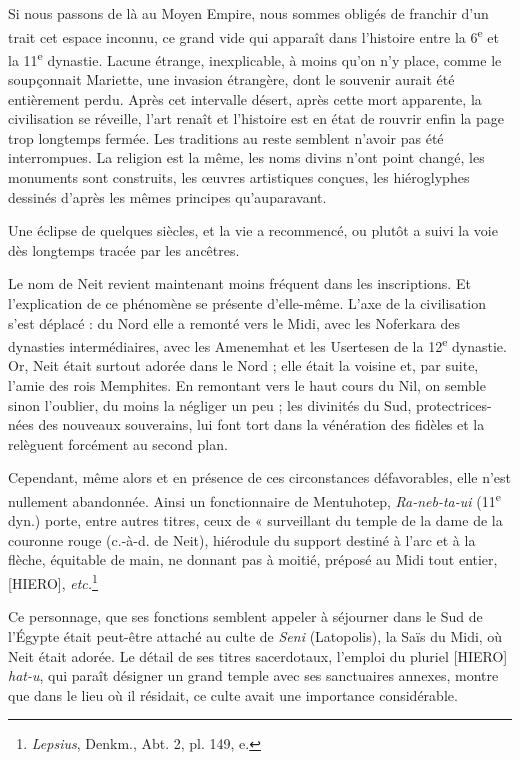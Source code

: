 \documentclass[a4paper, 11pt, oneside]{article}
\begin{document}
Si nous passons de là au Moyen Empire, nous sommes obligés de franchir d'un trait cet espace inconnu, ce grand vide qui apparaît dans l'histoire entre la 6\textsuperscript{e} et la 11\textsuperscript{e} dynastie. Lacune étrange, inexplicable, à moins qu'on n'y place, comme le soupçonnait Mariette, une invasion étrangère, dont le souvenir aurait été entièrement perdu. Après cet intervalle désert, après cette mort apparente, la civilisation se réveille, l'art renaît et l'histoire est en état de rouvrir enfin la page trop longtemps fermée. Les traditions au reste semblent n'avoir pas été interrompues. La religion est la même, les noms divins n'ont point changé, les monuments sont construits, les œuvres artistiques conçues, les hiéroglyphes dessinés d'après les mêmes principes qu'auparavant.

Une éclipse de quelques siècles, et la vie a recommencé, ou plutôt a suivi la voie dès longtemps tracée par les ancêtres.

Le nom de Neit revient maintenant moins fréquent dans les inscriptions. Et l'explication de ce phénomène se présente d'elle-même. L'axe de la civilisation s'est déplacé : du Nord elle a remonté vers le Midi, avec les Noferkara des dynasties intermédiaires, avec les Amenemhat et les Usertesen de la 12\textsuperscript{e} dynastie. Or, Neit était surtout adorée dans le Nord ; elle était la voisine et, par suite, l'amie des rois Memphites. En remontant vers le haut cours du Nil, on semble sinon l'oublier, du moins la négliger un peu ; les divinités du Sud, protectrices-nées des nouveaux souverains, lui font tort dans la vénération des fidèles et la relèguent forcément au second plan.

Cependant, même alors et en présence de ces circonstances défavorables, elle n'est nullement abandonnée. Ainsi un fonctionnaire de Mentuhotep, \emph{Ra-neb-ta-ui} (11\textsuperscript{e} dyn.) porte, entre autres titres, ceux de « surveillant du temple de la dame de la couronne rouge (c.-à-d. de Neit), hiérodule du support destiné à l'arc et à la flèche, équitable de main, ne donnant pas à moitié, préposé au Midi tout entier, [HIERO], \emph{etc.}\footnote{\emph{Lepsius}, Denkm., Abt. 2, pl. 149, e.}

Ce personnage, que ses fonctions semblent appeler à séjourner dans le Sud de l'Égypte était peut-être attaché au culte de \emph{Seni} (Latopolis), la Saïs du Midi, où Neit était adorée. Le détail de ses titres sacerdotaux, l'emploi du pluriel [HIERO] \emph{hat-u}, qui paraît désigner un grand temple avec ses sanctuaires annexes, montre que dans le lieu où il résidait, ce culte avait une importance considérable.
\end{document}
